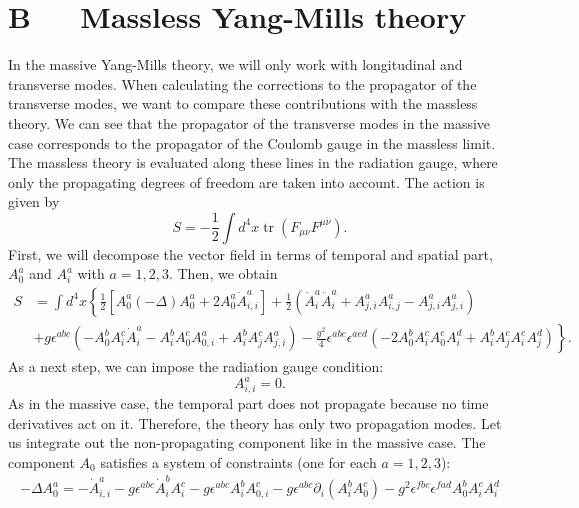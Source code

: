 \documentclass{article}
\DeclareMathOperator{\tr}{tr}
\begin{document}
\section*{\textbf{B} $\quad$ Massless Yang-Mills theory}\label{section:B}
In the massive Yang-Mills theory, we will only work with longitudinal and transverse modes. When calculating the corrections to the propagator of the transverse modes, we want to compare these contributions with the massless theory. We can see that the propagator of the transverse modes in the massive case corresponds to the propagator of the Coulomb gauge in the massless limit. The massless theory is evaluated along these lines in the radiation gauge, where only the propagating degrees of freedom are taken into account. 
The action is given by 
\begin{equation}
    S=-\frac{1}{2}\int d^4x\tr(F_{\mu\nu}F^{\mu\nu}).
\end{equation}
First, we will decompose the vector field in terms of temporal and spatial part, $A_0^a$ and $A_i^a$ with $a=1,2,3$. Then, we obtain
\begin{equation}
\begin{split}
    S&=\int d^4x\left\{\frac{1}{2}\left[A_0^a(-\Delta)A_0^a+2A_0^a\Dot{A}_{i,i}^{a}\right]
    +\frac{1}{2}(\dot{A}_i^a\dot{A}_i^a+A_{j,i}^aA_{i,j}^a-A_{j,i}^aA_{j,i}^a)\right.\\
    &\left.+g\epsilon^{abc}(-A_0^bA_i^c\dot{A}_i^a-A_i^bA_0^cA_{0,i}^a+A_i^bA_j^cA_{j,i}^a)
    -\frac{g^2}{4}\epsilon^{abc}\epsilon^{aed}(-2A_0^bA_i^cA_0^eA_i^d+A_i^bA_j^cA_i^eA_j^d)\right\}.
\end{split}
\end{equation}
As a next step, we can impose the radiation gauge condition:
\begin{equation*}
    A_{i,i}^a=0.
\end{equation*}
As in the massive case, the temporal part does not propagate because no time derivatives act on it. Therefore, the theory has only two propagation modes. Let us integrate out the non-propagating component like in the massive case. The component $A_0$ satisfies a system of constraints (one for each $a=1,2,3$):
\begin{equation}
\begin{split}
    -\Delta A_0^a=-\dot{A}_{i,i}^a-g\epsilon^{abc}\dot{A}_i^bA_i^c-g\epsilon^{abc}A_i^bA_{0,i}^c-g\epsilon^{abc}\partial_i(A_i^bA_0^c)-g^2\epsilon^{fbc}\epsilon^{fad}A_0^bA_i^cA_i^d
\end{split}
\end{equation}
\end{document}
